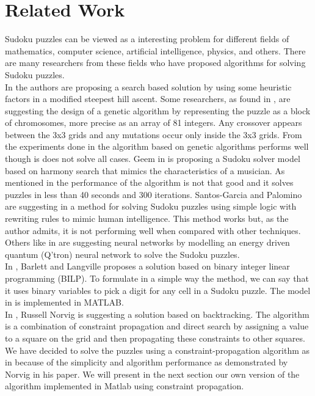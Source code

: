 \documentclass[12pt,a4paper]{article} %
\begin{document}
\section{Related Work}
Sudoku puzzles can be viewed as a interesting problem for different fields of mathematics, computer science, artificial intelligence, physics, and others. There are many researchers from these fields who have proposed algorithms for solving Sudoku puzzles. 
\newline
\\ In \cite{jones2008construction} the authors are proposing a search based solution by using some heuristic factors in a modified steepest hill ascent. Some researchers, as found in \cite{mantere2007solving}, are suggesting the design of a genetic algorithm by representing the puzzle as a block of chromosomes, more precise as an array of 81 integers. Any crossover appears between the 3x3 grids and any mutations occur only inside the 3x3 grids. From the experiments done in \cite{mantere2007solving} the algorithm based on genetic algorithms performs well though is does not solve all cases. Geem in \cite{geem2008harmony} is proposing a Sudoku solver model based on harmony search that mimics the characteristics of a musician. As mentioned in \cite{green2009survey} the performance of the algorithm is not that good and it solves puzzles in less than 40 seconds and 300 iterations. Santos-Garcia and Palomino are suggesting in \cite{santos2007solving} a method for solving Sudoku puzzles using simple logic with rewriting rules to mimic human intelligence. This method works but, as the author admits, it is not performing well when compared with other techniques. Others like in \cite{yue2006sudoku} are suggesting neural networks by modelling an energy driven quantum (Q'tron) neural network to solve the Sudoku puzzles. 
\newline
\\ In \cite{bartlett2006integer}, Barlett and Langville proposes a solution based on binary integer linear programming (BILP). To formulate in a simple way the method, we can say that it uses binary variables to pick a digit for any cell in a Sudoku puzzle. The model in \cite{bartlett2006integer} is implemented in MATLAB.
\newline
\\ In \cite{norvigsolving}, Russell Norvig is suggesting a solution based on backtracking. The algorithm is a combination of constraint propagation and direct search by assigning a value to a square on the grid and then propagating these constraints to other squares.
\newline
\\ We have decided to solve the puzzles using a constraint-propagation algorithm as in \cite{norvigsolving} because of the simplicity and algorithm performance as demonstrated by Norvig in his paper. We will present in the next section our own version of the algorithm implemented in Matlab using constraint propagation.
\end{document}
